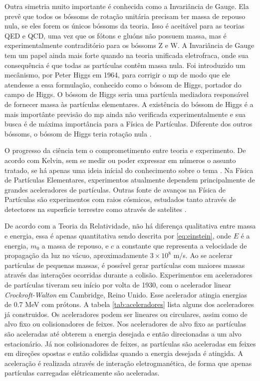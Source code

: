 Outra simetria muito importante é conhecida como a Invariância de Gauge.
Ela prevê que todos os bóssoms de rotação unitária precisam ter
massa de repouso nula, se eles forem os únicos bóssoms da teoria.
Isso é aceitável para as teorias QED e QCD, uma vez que os
fótons e gluóns não possuem massa, mas é experimentalmente contraditório
para os bóssoms Z e W. A Invariância de Gauge tem um papel ainda mais forte
quando na teoria unificada eletrofraca, onde sua consequência é que todas as
partículas contêm massa nula. Foi introduzido um mecânismo, 
por Peter Higgs em 1964, para corrigir o \gls{mp} de modo que ele atendesse
a essa formulação, conhecido como o bóssom de Higgs, portador do campo de Higgs. O bóssom de Higgs seria
uma partícula mediadora responsável de fornecer massa às partículas elementares.
A existência do bóssom de Higgs é a mais importânte previsão do \gls{mp} 
ainda não verificada experimentalmente e sua busca é de máxima importância para
a Física de Partículas. Diferente dos outros bóssoms, o
bóssom de Higgs teria rotação nula \cite{Intro_Nuclear}.

O progresso da ciência tem o comprometimento entre teoria e experimento. De
acordo com Kelvin, sem se medir ou poder expressar em números o assunto tratado, 
se há apenas uma ideia inícial do conhecimento sobre o tema \cite{kelvin}. 
Na Física de Partículas Elementares, experimentos atualmente dependem
principalmente de grandes aceleradores de partículas. Outras fonte de avanços na
Física de Partículas são experimentos com raios cósmicos, estudados tanto
através de detectores na superficie terrestre como através de satelites 
\cite{nature_space_and_time}. 

De acordo com a Teoria da Relatividade, não há diferença qualitativa entre
massa e energia, essa é apenas quantitativa \cite{einstein} sendo descrita por
\ref{eq:einstein}, onde $E$ é a energia, $m_0$ a massa de repouso, e $c$ a constante que representa a
velocidade de propagação da luz no vácuo, aproximadamente $3\times10^{8}$ m/s. Ao se acelerar
partículas de pequenas massas, é possível gerar partículas com maiores massas
através das interações ocorridas durante a colisão. Experimentos em
aceleradores de partículas tiveram seu início por volta de 1930, com o
acelerador linear \emph{Crockroft-Walton} em Cambridge, Reino Unido. Esse
acelerador atingia energias de 0.7 MeV com prótons. A tabela
\ref{tab:aceleradores} lista alguns dos aceleradores já construidos. Os
aceleradores podem ser lineares ou circulares, assim como de alvo fixo ou colisionadores
de feixes. Nos aceleradores de alvo fixo as partículas são aceleradas até
obterem a energia desejada e então direcionadas a um alvo estacionário. Já nos
colisionadores de feixes, as partículas são aceleradas em feixes em direções
opostas e então colididas quando a energia desejada é atingida. A aceleração é
realizada através de interação eletrogmanética, de forma que apenas
partículas carregadas elétricamente são aceleradas.

